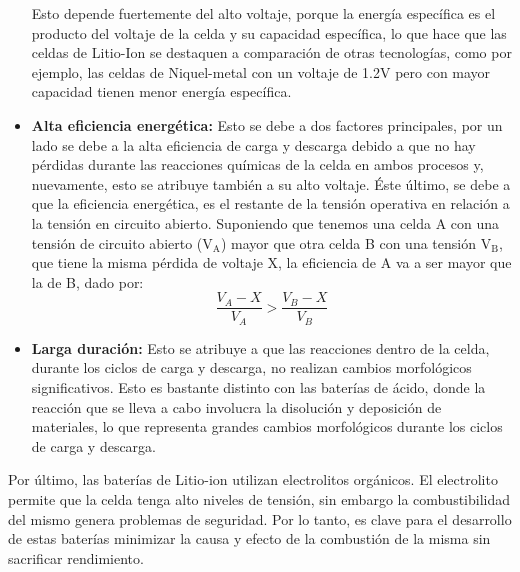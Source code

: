 \documentclass[10pt,a4paper]{article}
\begin{document}
\begin{itemize}
            Esto depende fuertemente del 
            alto voltaje, porque la energía específica es el producto del voltaje 
            de la celda y su capacidad específica, lo que hace que las celdas de 
            Litio-Ion se destaquen a comparación de otras tecnologías, 
            como por ejemplo, las celdas de Niquel-metal con un voltaje de 1.2V 
            pero con mayor capacidad tienen menor energía específica. 
		\item \textbf{Alta eficiencia energética:} Esto se debe a dos 
        factores principales, por un lado se debe a la alta eficiencia de 
        carga y descarga debido a que no hay pérdidas durante las reacciones 
        químicas de la celda en ambos procesos y, nuevamente, esto se atribuye 
        también a su alto voltaje. Éste último, se debe a que la eficiencia 
        energética, es el restante de la tensión operativa en relación a la 
        tensión en circuito abierto. Suponiendo que tenemos una celda A con una 
        tensión de circuito abierto ($\mathrm{V_A}$) mayor que otra celda B con 
        una tensión $\mathrm{V_B}$, que tiene la misma pérdida de voltaje X, 
        la eficiencia de A va a ser mayor que la de B, dado por:
        \vspace{5mm}
		\begin{equation}
			\frac{V_A - X}{V_A} > \frac{V_B - X}{V_B} \nonumber
		\end{equation}
		\item \textbf{Larga duración:} Esto se atribuye a que las reacciones 
        dentro de la celda, durante los ciclos de carga y descarga, no realizan 
        cambios morfológicos significativos. Esto es bastante distinto con las 
        baterías de ácido, donde la reacción que se lleva a cabo involucra la 
        disolución y deposición de materiales, lo que representa grandes 
        cambios morfológicos durante los ciclos de carga y descarga.
	\end{itemize}
	
	\noindent Por último, las baterías de Litio-ion utilizan electrolitos 
    orgánicos. El electrolito permite que la celda tenga alto niveles de 
    tensión, sin embargo la combustibilidad del mismo genera problemas de 
    seguridad. Por lo tanto, es clave para el desarrollo de estas baterías 
    minimizar la causa y efecto de la combustión de la misma sin sacrificar 
    rendimiento.
\end{document}
